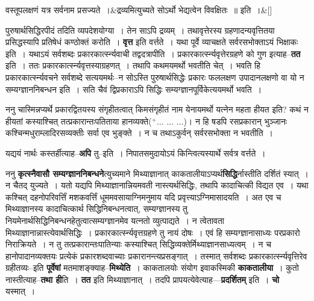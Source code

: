 \documentclass[article,12pt,a4paper]{memoir}
\newcommand{\add}[1]{($^{+}$#1)}
\begin{document}
	  \bigskip
	  \begingroup
	
	    
	    \stanza[\smallbreak]
	वस्तूपलक्षणं यत्र सर्वनाम प्रसज्यते ।&द्रव्यमित्युच्यते सोऽर्थो भेद्यत्वेन विवक्षितः ॥ इति ।\&[\smallbreak]


	
	  \endgroup
	

	  \pstart पुरुषार्थसिद्धिरपीदं तदिति व्यपदेशयोग्या । तेन साऽपि द्रव्यम् । तथावृत्तेरस्य ग्रहणादन्यवृत्तितया प्रसिद्धस्यापि प्रतिषेधं कण्ठोक्तं करोति । \textbf{वृत्त} इति वर्त्तते । यथा पूर्वे व्याचक्षते सर्वरसभोक्ताऽयं भिक्षाकः इति । यथाऽयं सर्वशब्दः प्रकारकार्त्स्न्यवाची तद्वदत्रापीति । प्रकारकार्त्स्न्यवृत्तेरग्रहणे को गुण इत्याह--\textbf{तत} इति । ततः प्रकारकार्त्स्न्यवृत्तस्याग्रहणत् । तथापि कथमयमर्थो भवतीति चेत् । भवति हि प्रकारकार्त्स्न्यवचने सर्वशब्दे सत्ययमर्थः--न सोऽस्ति पुरुषार्थसिद्धेः प्रकारः फललक्षण उपादानलक्षणो वा यो न सम्यग्ज्ञाननिबन्धन इति । सति चैवं द्विप्रकाराऽपि सिद्धिः सम्यग्ज्ञानपूर्विकेत्ययमर्थो भवति ।
	\pend
      

	  \pstart ननु चास्मिन्नप्यर्थे प्रकारद्वितयस्य संगृहीतत्वात् किमसंगृहीतं नाम येनायमर्थो यत्नेन महता हीयत इति? कथं न हीयतां कस्याश्चित् तत्प्रकारान्तःपतिताया हानव्यक्ते\add{... ... ...}। न हि षडपि रसप्रकारान् भुञ्जानः कश्चिन्मधुराम्लादिरसव्यक्तीः सर्वा एव भुङ्क्ते । न च तथाऽकुर्वन् सर्वरसभोक्ता न भवतीति ।
	\pend
      

	  \pstart यद्ययं नार्थः कस्तर्हीत्याह--\textbf{अपि} तु--इति । निपातसमुदायोऽयं किन्त्वित्यस्यार्थे सर्वत्र वर्त्तते ।
	\pend
      

	  \pstart ननु \textbf{कृत्स्नैवासौ सम्यग्ज्ञाननिबन्धने}त्युच्यमाने मिथ्याज्ञानात् काकतालीयाऽप्यर्थ\textbf{सिद्धि}र्नास्तीति दर्शितं स्यात् । न चैतद् युज्यते । यतो यद्यपि मिथ्याज्ञानान्नियमवती नास्त्यर्थसिद्धिः, तथापि कादाचित्की विद्यत एव । यथा कश्चित् दहनोपरिवर्त्तिं मशकवर्त्तिं धूममवसायाग्निमनुमाय यदि प्रवृत्त्याऽग्निमासादयति । अत एव च मिथ्याज्ञानस्य कादाचित्कार्थ \leavevmode{} सिद्धिनिबन्धनत्वात्, सम्यग्ज्ञानस्य तु नियमेनार्थसिद्धिनिबन्धनहेतुत्वात्सम्यग्ज्ञानमेव यत्नतो व्युत्पाद्यते । न त्वेतावता मिथ्याज्ञानान्नास्त्येवार्थसिद्धिः । प्रकारकार्त्स्न्यवृत्तग्रहणे तु नायं दोषः । एवं हि सम्यग्ज्ञानासाध्यः परप्रकारो निराक्रियते । न तु तत्प्रकारान्तःपातिन्याः कस्याश्चित् सिद्धिव्यक्तेर्मिथ्याज्ञानसाध्यत्वम् । न च हानोपादानव्यक्तयः प्रत्येकं प्रकारशब्दवाच्याः प्रकारानन्त्यप्रसङ्गात् । तस्मात् सर्वशब्दः प्रकारकार्त्स्न्यवृत्तिरेव ग्रहीतव्यः--इति \textbf{पूर्वेषां} मतमाशङ्क्याह--\textbf{मिथ्येति} । काकतालयोः संयोग इवाकस्मिकी \textbf{काकतालीया} । कुतो नास्तीत्याह--\textbf{तथा ही}ति । \textbf{तत} इति मिथ्याज्ञानात् । तदपि प्रापयत्येवेत्याह—\textbf{प्रदर्शितम्} इति । \textbf{चो} यस्मात् ।
	\pend
      
\end{document}
